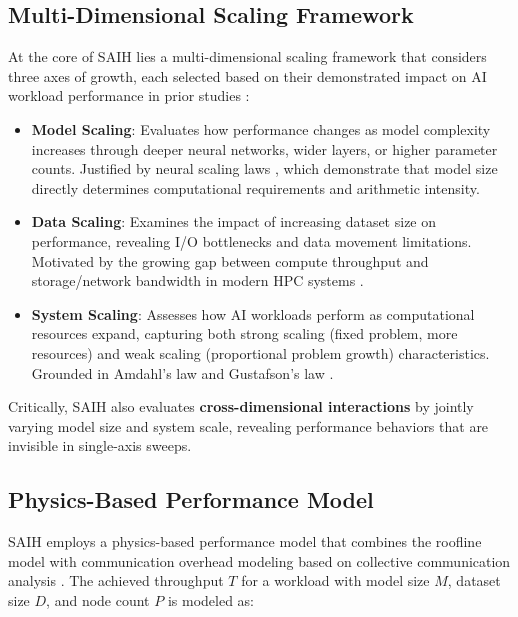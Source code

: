 \documentclass{llncs}
\begin{document}
\subsection{Multi-Dimensional Scaling Framework}

At the core of SAIH lies a multi-dimensional scaling framework that considers three axes of growth, each selected based on their demonstrated impact on AI workload performance in prior studies \cite{Wang2024SAIH, BenNun2019, Kaplan2020ScalingLaws}:

\begin{itemize}
    \item \textbf{Model Scaling}: Evaluates how performance changes as model complexity increases through deeper neural networks, wider layers, or higher parameter counts. Justified by neural scaling laws \cite{Kaplan2020ScalingLaws}, which demonstrate that model size directly determines computational requirements and arithmetic intensity.
    \item \textbf{Data Scaling}: Examines the impact of increasing dataset size on performance, revealing I/O bottlenecks and data movement limitations. Motivated by the growing gap between compute throughput and storage/network bandwidth in modern HPC systems \cite{Byna2020}.
    \item \textbf{System Scaling}: Assesses how AI workloads perform as computational resources expand, capturing both strong scaling (fixed problem, more resources) and weak scaling (proportional problem growth) characteristics. Grounded in Amdahl's law \cite{Amdahl1967} and Gustafson's law \cite{Gustafson1988}.
\end{itemize}

Critically, SAIH also evaluates \textbf{cross-dimensional interactions} by jointly varying model size and system scale, revealing performance behaviors that are invisible in single-axis sweeps.

\subsection{Physics-Based Performance Model}

SAIH employs a physics-based performance model that combines the roofline model \cite{Williams2009Roofline} with communication overhead modeling based on collective communication analysis \cite{Thakur2005Allreduce}. The achieved throughput $T$ for a workload with model size $M$, dataset size $D$, and node count $P$ is modeled as:
\end{document}
